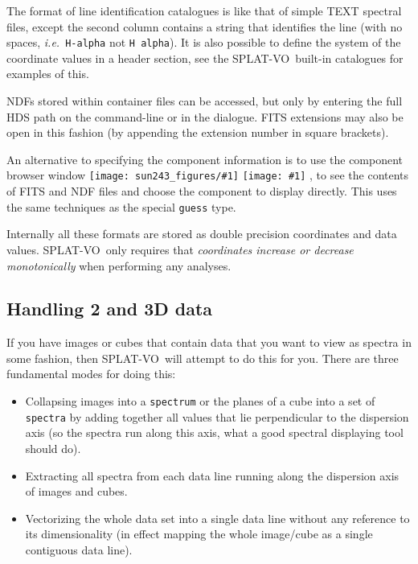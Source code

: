 \documentclass[twoside,11pt,nolof]{starlink}
\providecommand{\SPLAT}{\textsf{SPLAT-VO}}
\providecommand{\inline}[1]
        {\ifpdf
          \texttt{[image: sun243\_figures/\#1]}
          \else
          \texttt{[image: \#1]}
          \fi
        }
\newcommand{\submenuitem}[2]{\latexhtml{\textbf{#1$\rightarrow$#2}}{\textbf{#1->#2}}}
\providecommand{\hitext}[1]{\texttt{#1}}
\providecommand{\ie}{\textit{i.e.}}
\begin{document}
The format of line identification catalogues is like that of simple TEXT
spectral files, except the second column contains a string that identifies the
line (with no spaces, \ie\ \hitext{H-alpha} not \hitext{H alpha}). It is also
possible to define the system of the coordinate values in a header section,
see the \SPLAT\ built-in catalogues for examples of this.

NDFs stored within container files can be accessed, but only by entering the
full HDS path on the command-line or in the \submenuitem{File}{Open} dialogue.
FITS extensions may also be open in this fashion (by appending the extension
number in square brackets).

An alternative to specifying the component information is to use the component
browser window \inline{browse}, to see the contents of FITS and NDF files and
choose the component to display directly. This uses the same techniques as the
special \hitext{guess} type.

Internally all these formats are stored as double precision
coordinates and data values. \SPLAT\ only requires that
\textit{coordinates increase or decrease monotonically}
when performing any analyses.

\subsection{Handling 2 and 3D data}

If you have images or cubes that contain data that you want to view as spectra
in some fashion, then \SPLAT\ will attempt to do this for you. There are three
fundamental modes for doing this:
\begin{itemize}

\item Collapsing images into a \hitext{spectrum} or the planes of a cube into
a set of \hitext{spectra} by adding together all values that lie perpendicular
to the dispersion axis (so the spectra run along this axis, what a good
spectral displaying tool should do).

\item Extracting all spectra from each data line running along the
dispersion axis of images and cubes.

\item Vectorizing the whole data set into a single data line without any
reference to its dimensionality (in effect mapping the whole image/cube as a
single contiguous data line).

\end{itemize}
\end{document}
